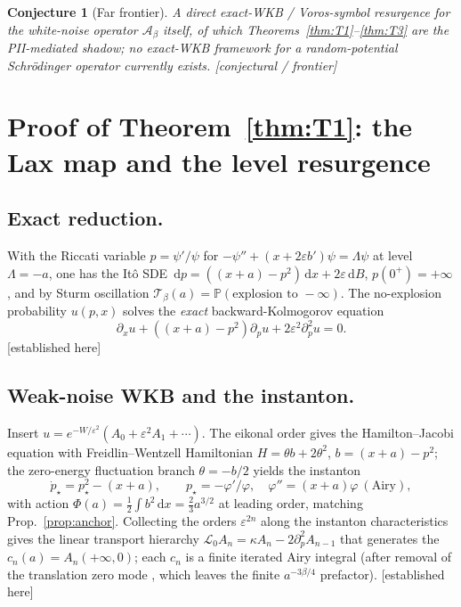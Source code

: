 \documentclass[11pt,reqno]{amsart}
\theoremstyle{plain}
\newtheorem{conjecture}[theorem]{Conjecture}
\theoremstyle{definition}
\theoremstyle{remark}
\newcommand{\dd}{\,\mathrm{d}}
\newcommand{\Prob}{\mathbb{P}}
\newcommand{\SAO}{\mathcal{A}_\beta}
\newcommand{\eps}{\varepsilon}
\newcommand{\pinst}{p_\star}
\newcommand{\tagPr}{{\footnotesize\textsf{[established here]}}}
\newcommand{\tagX}{{\footnotesize\textsf{[conjectural / frontier]}}}
\begin{document}
\begin{conjecture}[Far frontier]\label{conj:frontier}
A direct exact-WKB / Voros-symbol resurgence for the white-noise operator $\SAO$ itself, of which
Theorems~\ref{thm:T1}--\ref{thm:T3} are the PII-mediated shadow; no exact-WKB framework for a
random-potential Schr\"odinger operator currently exists. \tagX
\end{conjecture}

\section{Proof of Theorem~\ref{thm:T1}: the Lax map and the level resurgence}\label{sec:T1proof}

\subsection{Exact reduction.}
With the Riccati variable $p=\psi'/\psi$ for $-\psi''+(x+2\eps b')\psi=\Lambda\psi$ at level
$\Lambda=-a$, one has the It\^o SDE $\dd p=((x+a)-p^2)\dd x+2\eps\dd B$, $p(0^+)=+\infty$, and by
Sturm oscillation $\mathcal T_\beta(a)=\Prob(\text{explosion to }-\infty)$. The no-explosion
probability $u(p,x)$ solves the \emph{exact} backward-Kolmogorov equation
\begin{equation}\label{eq:bk}
\partial_x u+((x+a)-p^2)\partial_p u+2\eps^2\partial_p^2 u=0.
\end{equation}
\tagPr

\subsection{Weak-noise WKB and the instanton.}
Insert $u=e^{-W/\eps^2}(A_0+\eps^2 A_1+\cdots)$. The eikonal order gives the Hamilton--Jacobi
equation with Freidlin--Wentzell Hamiltonian $H=\theta b+2\theta^2$, $b=(x+a)-p^2$; the
zero-energy fluctuation branch $\theta=-b/2$ yields the instanton
\begin{equation}\label{eq:inst}
\dot\pinst=\pinst^2-(x+a),\qquad \pinst=-\varphi'/\varphi,\quad \varphi''=(x+a)\varphi\ (\text{Airy}),
\end{equation}
with action $\Phi(a)=\tfrac12\int b^2\dd x=\tfrac23 a^{3/2}$ at leading order, matching
Prop.~\ref{prop:anchor}. Collecting the orders $\eps^{2n}$ along the instanton characteristics gives
the linear transport hierarchy $\mathcal L_0 A_n=\kappa A_n-2\partial_p^2 A_{n-1}$ that generates the
$c_n(a)=A_n(+\infty,0)$; each $c_n$ is a finite iterated Airy integral (after removal of the
translation zero mode \cite{SGG}, which leaves the finite $a^{-3\beta/4}$ prefactor). \tagPr
\end{document}
